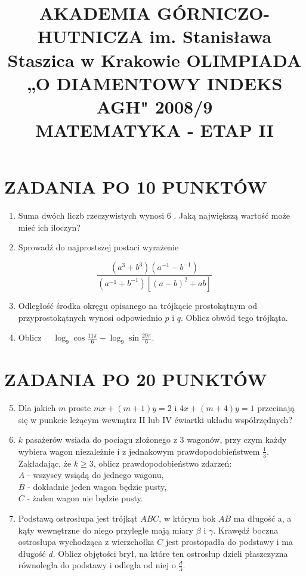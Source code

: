 \documentclass[10pt]{article}
\title{AKADEMIA GÓRNICZO-HUTNICZA im. Stanisława Staszica w Krakowie OLIMPIADA „O DIAMENTOWY INDEKS AGH" 2008/9 \\
 MATEMATYKA - ETAP II }
\author{}
\date{}
\begin{document}
\maketitle
\section*{ZADANIA PO 10 PUNKTÓW}
\begin{enumerate}
  \item Suma dwóch liczb rzeczywistych wynosi 6 . Jaką największą wartość może mieć ich iloczyn?
  \item Sprowadź do najprostszej postaci wyrażenie
\end{enumerate}

$$
\frac{\left(a^{3}+b^{3}\right)\left(a^{-1}-b^{-1}\right)}{\left(a^{-1}+b^{-1}\right)\left[(a-b)^{2}+a b\right]}
$$

\begin{enumerate}
  \setcounter{enumi}{2}
  \item Odległość środka okręgu opisanego na trójkącie prostokątnym od przyprostokątnych wynosi odpowiednio $p$ i $q$. Oblicz obwód tego trójkąta.
  \item Oblicz $\quad \log _{9} \cos \frac{11 \pi}{6}-\log _{9} \sin \frac{29 \pi}{6}$.
\end{enumerate}

\section*{ZADANIA PO 20 PUNKTÓW}
\begin{enumerate}
  \setcounter{enumi}{4}
  \item Dla jakich $m$ proste $m x+(m+1) y=2$ i $4 x+(m+4) y=1$ przecinają się w punkcie leżącym wewnątrz II lub IV ćwiartki układu współrzędnych?
  \item $k$ pasażerów wsiada do pociagu złożonego z 3 wagonów, przy czym każdy wybiera wagon niezależnie i z jednakowym prawdopodobieństwem $\frac{1}{3}$. Zakładając, że $k \geq 3$, oblicz prawdopodobieństwo zdarzeń:\\
$A$ - wszyscy wsiądą do jednego wagonu,\\
$B$ - dokładnie jeden wagon będzie pusty,\\
$C$ - żaden wagon nie będzie pusty.
  \item Podstawą ostrosłupa jest trójkąt $A B C$, w którym bok $A B$ ma długość a, a kąty wewnętrzne do niego przyległe mają miary $\beta$ i $\gamma$. Krawędź boczna ostrosłupa wychodząca z wierzchołka $C$ jest prostopadła do podstawy i ma długość $d$. Oblicz objętości brył, na które ten ostrosłup dzieli płaszczyzna równoległa do podstawy i odległa od niej o $\frac{d}{3}$.
\end{enumerate}
\end{document}
